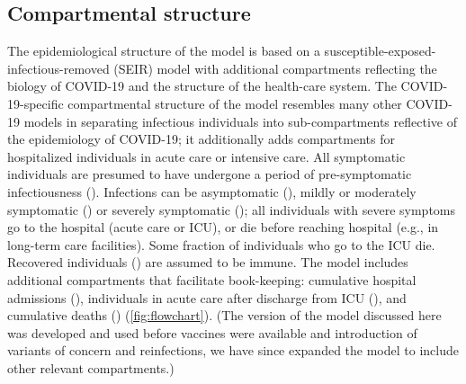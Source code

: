 \documentclass[12pt]{article}\usepackage[]{graphicx}\usepackage[]{color}
\begin{document}
\subsection*{Compartmental structure}

The epidemiological structure of the model is based on a susceptible-exposed-infectious-removed (SEIR) model with additional compartments reflecting the biology of COVID-19 and the structure of the health-care system. 
The COVID-19-specific compartmental structure of the model resembles many other COVID-19 models \cite{childs2021impact, tuite2020mathematical, kainChopping2021} in separating infectious individuals into sub-compartments reflective of the epidemiology of COVID-19; it additionally adds compartments for hospitalized individuals in acute care or intensive care. 
All symptomatic individuals are presumed to have undergone a period of pre-symptomatic infectiousness (). 
Infections can be asymptomatic (), mildly or moderately symptomatic () or severely symptomatic (); all individuals with severe symptoms go to the hospital (acute care or ICU), or die before reaching hospital (e.g., in long-term care facilities).
Some fraction  of individuals who go to the ICU die. Recovered individuals () are assumed to be immune.  
The model includes additional compartments that facilitate book-keeping: cumulative hospital admissions (), individuals in acute care after discharge from ICU (), and cumulative deaths () (\cref{fig:flowchart}).
(The version of the model discussed here was developed and used before vaccines were available and introduction of variants of concern and reinfections, we have since expanded the model to include other relevant compartments.)

\end{document}
